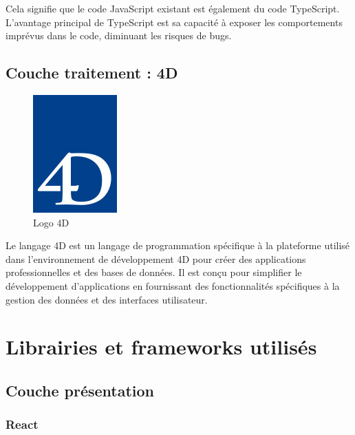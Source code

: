 Cela signifie que le code JavaScript existant est également du code TypeScript. L’avantage principal de TypeScript est sa capacité à exposer les comportements imprévus dans le code, diminuant les risques de bugs.\cite{Typescript}

\subsection{Couche traitement : 4D}

\begin{figure}[H]
    \centering
    \includegraphics[scale=0.8]{Logos/Logo-4D.jpg}
    \caption{Logo 4D}
\end{figure}

Le langage 4D est un langage de programmation spécifique à la plateforme utilisé dans l’environnement de développement 4D pour créer des applications professionnelles et
des bases de données. Il est conçu pour simplifier le développement d’applications en fournissant des fonctionnalités
spécifiques à la gestion des données et des interfaces utilisateur.

\section{Librairies et frameworks utilisés}

\subsection{Couche présentation}

\subsubsection{React}



